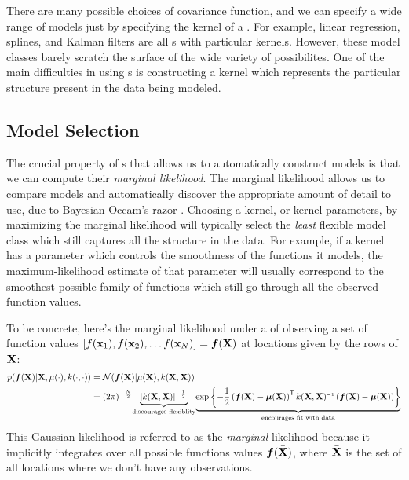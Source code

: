 There are many possible choices of covariance function, and we can specify a wide range of models just by specifying the kernel of a \gp{}.
For example, 
linear regression, splines, 
and Kalman filters are all \gp{}s with particular kernels.
However, these model classes barely scratch the surface of the wide variety of possibilites.
%
One of the main difficulties in using \gp{}s is constructing a kernel which represents the particular structure present in the data being modeled.


\subsection{Model Selection}

The crucial property of \gp{}s that allows us to automatically construct models is that we can compute their \emph{marginal likelihood}.
The marginal likelihood allows us to compare models and automatically discover the appropriate amount of detail to use, due to Bayesian Occam's razor \citep{rasmussen2001occam,mackay2003information}.
Choosing a kernel, or kernel parameters, by maximizing the marginal likelihood will typically select the \emph{least} flexible model class which still captures all the structure in the data.
For example, if a kernel has a parameter which controls the smoothness of the functions it models, the maximum-likelihood estimate of that parameter will usually correspond to the smoothest possible family of functions which still go through all the observed function values.

To be concrete, here's the marginal likelihood under a \gp{} of observing a set of function values $\left[ f({\bf{x}}_1), f({\bf{x}}_2), \ldots f({\bf{x}}_N)  \right] = \boldsymbol{f}(\mathbf{X})$ at locations given by the rows of $\mathbf{X}$:
%
\begin{align}
p(\funcval | \vX, \mu(\cdot), k(\cdot, \cdot)) & = \N{\funcval}{\mu(\vX)}{k(\vX, \vX)} \nonumber\\
& = (2\pi)^{-\frac{N}{2}} \underwrite{|k(\vX, \vX)|^{-\frac{1}{2}}\,}{discourages flexiblity} \underwrite{\exp \left\{ -\frac{1}{2} \left( \funcval - \boldsymbol\mu(\vX) \right)\tra k(\vX, \vX)\inv \left(\funcval - \boldsymbol\mu(\vX) \right) \right\}}{encourages fit with data}
\label{eq:gp_marg_lik}
\end{align}
%
This Gaussian likelihood is referred to as the \emph{marginal} likelihood because it implicitly integrates over all possible functions values $\boldsymbol{f}( \bar {\mathbf{X}})$, where $\bar {\mathbf{X}}$ is the set of all locations where we don't have any observations.

